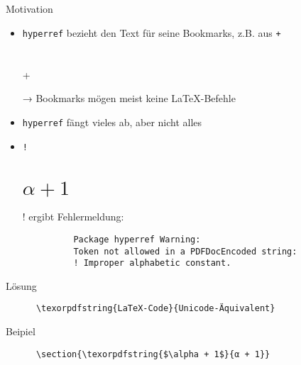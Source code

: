 \subsection{}

\begin{frame}[fragile]{}
  \begin{block}{Motivation}
    \begin{itemize}
      \item \texttt{hyperref} bezieht den Text für seine Bookmarks, z.B. aus \texttt+\section{ }+
      \item[→] Bookmarks mögen meist keine \LaTeX-Befehle
      \item \texttt{hyperref} fängt vieles ab, aber nicht alles
      \item
        \texttt!\section{$\alpha + 1$}! ergibt Fehlermeldung:
        \begin{verbatim}
          Package hyperref Warning:
          Token not allowed in a PDFDocEncoded string:
          ! Improper alphabetic constant.
        \end{verbatim}
    \end{itemize}
  \end{block}
  \begin{block}{Lösung}
    \begin{verbatim}
      \texorpdfstring{LaTeX-Code}{Unicode-Äquivalent}
    \end{verbatim}
  \end{block}
  \begin{block}{Beipiel}
    \begin{verbatim}
      \section{\texorpdfstring{$\alpha + 1$}{α + 1}}
    \end{verbatim}
  \end{block}
\end{frame}
